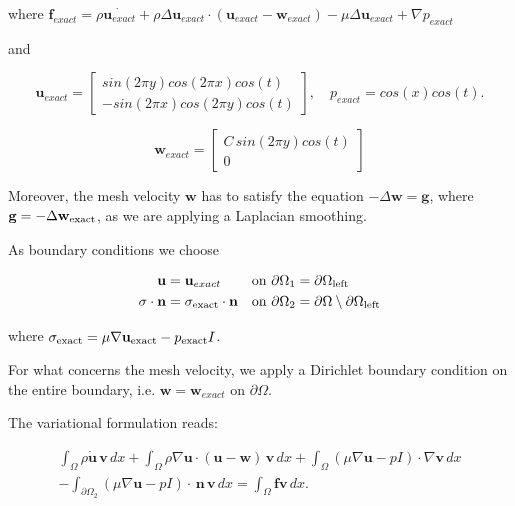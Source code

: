 \documentclass[11pt,a4paper,titlepage]{report}
\begin{document}
where $\mathbf{f}_{exact} = \rho \dot{\mathbf{u}_{exact}} + \rho \Delta \mathbf{u}_{exact} \cdot (\mathbf{u}_{exact} - \mathbf{w}_{exact}) - \mu \Delta \mathbf{u}_{exact} +  \nabla p_{exact}$

and

\begin{equation}
\mathbf{u}_{exact} = \left[ \begin{array}{c} sin(2\pi y) cos(2\pi x) cos(t) \\ - sin(2 \pi x) cos(2 \pi y) cos(t) \end{array} \right], \quad
p_{exact} = cos(x) cos(t).
\end{equation}

\begin{equation}
\mathbf{w}_{exact} = \left[ \begin{array}{c} C \, sin(2 \pi y) cos(t) \\
0 \end{array} \right]
\end{equation}

Moreover, the mesh velocity $\mathbf{w}$ has to satisfy the equation $- \Delta \mathbf{w} = \mathbf{g}$, where $\mathbf{g} = - \Delta \mathbf{w}_{\rm exact}$, as we are applying a Laplacian smoothing.

As boundary conditions we choose

\begin{align}
\mathbf{u} &= \mathbf{u}_{exact} &&\text{on } \partial \Omega_1 =  \partial \Omega_{\rm left} \\
\sigma \cdot \mathbf{n} &= \sigma_{\rm exact} \cdot \mathbf{n} &&\text{on }  \partial \Omega_ 2 = \partial \Omega \setminus  \partial \Omega_{\rm left} \\
\end{align}

where $\sigma_{\rm exact} = \mu \nabla \mathbf{u}_{\rm exact} - p_{\rm exact}I$.

For what concerns the mesh velocity, we apply a Dirichlet boundary condition on the entire boundary, i.e. $\mathbf{w} = \mathbf{w}_{exact}$ on $\partial \Omega$.	

The variational formulation reads:

\begin{equation}
\begin{split}
\int_{\Omega} \rho \dot{\mathbf{u}} \, \mathbf{v} \, dx
+ \int_{\Omega} \rho  \nabla \mathbf{u} \cdot (\mathbf{u - w}) \, \mathbf{v} \, dx
+ \int_{\Omega} (\mu \nabla \mathbf{u} - pI) \cdot \nabla \mathbf{v} \, dx \\
- \int_{\partial \Omega_2} (\mu \nabla \mathbf{u} - p I) \cdot \, \mathbf{n} \, \mathbf{v} \, dx
=  \int_{\Omega} \mathbf{f} \mathbf{v} \, dx.
\end{split}
\end{equation}
\end{document}
